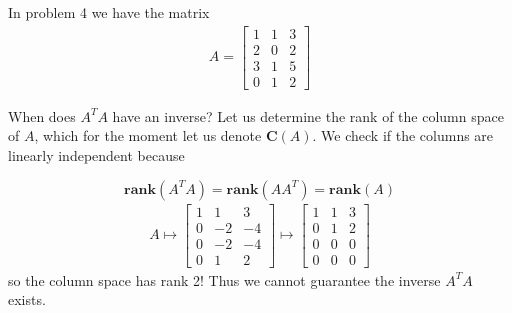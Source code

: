 \documentclass[12pt]{article}
\theoremstyle{definition}
\begin{document}
In problem 4 we have the matrix
\begin{align*}
A=
\begin{bmatrix}
1 & 1 & 3 \\ 
2 & 0 & 2 \\ 
3 & 1 & 5 \\ 
0 & 1 & 2
\end{bmatrix} 
\end{align*}

When does $A^TA$ have an inverse? Let us determine the rank of the column space of $A$, which for the moment let us denote $\mathbf{C}(A)$. We check if the columns are linearly independent because

\begin{equation}
\textbf{rank}(A^TA)=\textbf{rank}(AA^T)=\textbf{rank}(A)
\end{equation}
\begin{align*}
A\mapsto \left[\begin{array}{rrr}
1 & 1 & 3 \\ 
0 & -2 & -4 \\ 
0 & -2 & -4\\ 
0 & 1 & 2
\end{array}\right]\mapsto
 \left[\begin{array}{rrr}
1 & 1 & 3 \\ 
0 & 1 & 2 \\ 
0 & 0 & 0\\ 
0 & 0 & 0
\end{array}\right]
\end{align*}
so the column space has rank 2! Thus we cannot guarantee the inverse $A^TA$ exists. 
\end{document}
